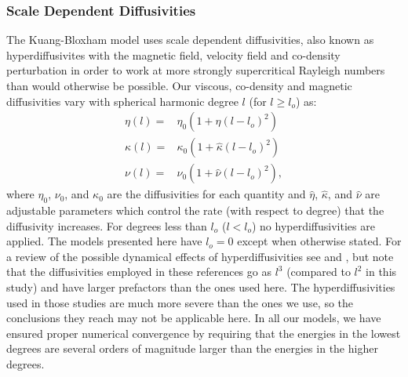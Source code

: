\subsubsection{Scale Dependent Diffusivities}
The Kuang-Bloxham model uses scale dependent diffusivities, also known as hyperdiffusivites with the magnetic field, velocity field and co-density perturbation in order to work at more strongly supercritical Rayleigh numbers than would otherwise be possible. Our viscous, co-density and magnetic diffusivities vary with spherical harmonic degree $l$ (for $l\geq l_{o}$) as:
\begin{align}
\eta\left(l\right)= & {} \eta_{0}\left(1+\hat{\eta} \left(l-l_{o}\right)^{2}\right) \label{eq:hyperdiffseta}\\
\kappa\left(l\right)= & {} \kappa_{0}\left(1+\hat{\kappa} \left(l-l_{o}\right)^{2}\right) \label{eq:hyperdiffskappa}\\
\nu\left(l\right)= & {} \nu_{0}\left(1+\hat{\nu} \left(l-l_{o}\right)^{2}\right), \label{eq:hyperdiffsnu} 
\end{align}
where $\eta_{0}$, $\nu_{0}$, and $\kappa_{0}$ are the diffusivities for each quantity and $\hat{\eta}$, $\hat{\kappa}$, and $\hat{\nu}$ are adjustable parameters which control the rate (with respect to degree) that the diffusivity increases. For degrees less than $l_{o}$ ($l<l_{o}$) no hyperdiffusivities are applied. The models presented here have $l_{o}=0$ except when otherwise stated. For a review of the possible dynamical effects of hyperdiffusivities see \citet{zhang1998} and \cite{grote2000}, but note that the diffusivities employed in these references go as $l^3$ (compared to $l^2$ in this study) and have larger prefactors than the ones used here. The hyperdiffusivities used in those studies are much more severe than the ones we use, so the conclusions they reach may not be applicable here. In all our models, we have ensured proper numerical convergence by requiring that the energies in the lowest degrees are several orders of magnitude larger than the energies in the higher degrees.

